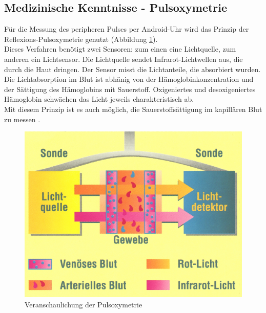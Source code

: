 \subsection{Medizinische Kenntnisse - Pulsoxymetrie} 
Für die Messung des peripheren Pulses per Android-Uhr wird das Prinzip der Reflexions-Pulsoxymetrie genutzt (Abbildung \ref{pic:pulsoxy}).\\[0.5cm]
Dieses Verfahren benötigt zwei Sensoren: zum einen eine Lichtquelle, zum anderen ein Lichtsensor. Die Lichtquelle sendet Infrarot-Lichtwellen aus, die durch die Haut dringen. Der Sensor misst die Lichtanteile, die absorbiert wurden. \\[0.5cm]
Die Lichtabsorption im Blut ist abhänig von der Hämoglobinkonzentration und der Sättigung des Hämoglobins mit Sauerstoff. Oxigeniertes und desoxigeniertes Hämoglobin schwächen das Licht jeweils charakteristisch ab. \\[0.5cm]
Mit diesem Prinzip ist es auch möglich, die Sauerstoffsättigung im kapillären Blut zu messen \cite{behandlungsassitenz}.\\[0.5cm]
\begin{figure}[H]
	\centering
	\includegraphics[scale=1.0]{images/pulsoxy.jpg}
	\caption{Veranschaulichung der Pulsoxymetrie\cite{messprinzip-pulsoxi}}
	\label{pic:pulsoxy}
\end{figure}


